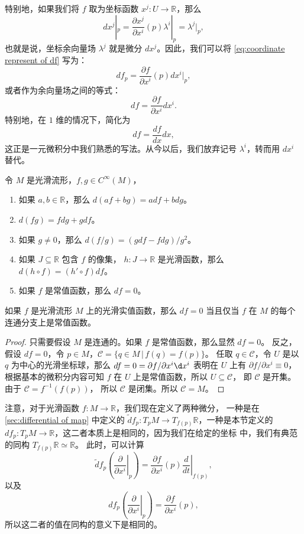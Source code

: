 特别地，如果我们将 $f$ 取为坐标函数 $x^j:U\to \mathbb{R}$，那么
\[
  dx^j|_p=  \frac{\partial x^j}{\partial x^i}(p)\lambda^i|_p
  =\lambda^j|_p,
\]
也就是说，坐标余向量场 $\lambda^j$ 就是微分 $dx^j$。因此，我们可以将
\eqref{eq:coordinate represent of df} 写为：
\[
  df_p=  \frac{\partial f}{\partial x^i}(p)dx^i|_p,
\]
或者作为余向量场之间的等式：
\begin{equation}
  df=\frac{\partial f}{\partial x^i}dx^i.
\end{equation}
特别地，在 $1$ 维的情况下，简化为
\[
  df=\frac{df}{dx}dx,  
\]
这正是一元微积分中我们熟悉的写法。从今以后，我们放弃记号
$\lambda^i$，转而用 $dx^i$ 替代。

\begin{proposition}[微分的性质]
  令 $M$ 是光滑流形，$f,g\in C^\infty(M)$，
  \begin{enumerate}
    \item 如果 $a,b\in \mathbb{R}$，那么
    $d(af+bg)=adf+bdg$。
    \item $d(fg)=fdg+gdf$。
    \item 如果 $g\neq 0$，那么 $d(f/g)=(gdf-fdg)/g^2$。
    \item 如果 $J\subseteq \mathbb{R}$ 包含 $f$ 的像集，
    $h:J\to \mathbb{R}$ 是光滑函数，那么
    $d(h\circ f)=(h'\circ f)df$。
    \item 如果 $f$ 是常值函数，那么 $df=0$。
  \end{enumerate}
\end{proposition}

\begin{proposition}[微分为零的函数]\label{prop:functions with vanishing differential}
  如果 $f$ 是光滑流形 $M$ 上的光滑实值函数，那么 $df=0$
  当且仅当 $f$ 在 $M$ 的每个连通分支上是常值函数。
\end{proposition}
\begin{proof}
  只需要假设 $M$ 是连通的。如果 $f$ 是常值函数，那么显然 $df=0$。
  反之，假设 $df=0$，令 $p\in M$，$\mathcal{C}=\{q\in M\,|\, f(q)=f(p)\}$。
  任取 $q\in \mathcal{C}$，令 $U$ 是以 $q$ 为中心的光滑坐标球，那么
  $df=0=\partial f/\partial x^i \d x^i$ 表明在 $U$ 上有
  $\partial f/\partial x^i\equiv 0$，根据基本的微积分内容可知
  $f$ 在 $U$ 上是常值函数，所以 $U\subseteq \mathcal{C}$，
  即 $\mathcal{C}$ 是开集。由于 $\mathcal{C}=f^{-1}(f(p))$，
  所以 $\mathcal{C}$ 是闭集。所以 $\mathcal{C}=M$。
\end{proof}


注意，对于光滑函数 $f:M\to \mathbb{R}$，我们现在定义了两种微分，
一种是在 \ref{sec:differential of map} 中定义的
$\tilde{d}\!f_p:T_pM\to T_{f(p)}\mathbb{R}$，一种是本节定义的
$df_p:T_pM\to \mathbb{R}$，这二者本质上是相同的，因为我们在给定的坐标
中，我们有典范的同构 $T_{f(p)}\mathbb{R}\simeq \mathbb{R}$。
此时，可以计算
\[
  \tilde d\!f_p\left(\left.\frac{\partial}{\partial x^i}\right|_p\right)
  =\frac{\partial f}{\partial x^i}(p)\left.\frac{d}{dt}\right|_{f(p)},
\]
以及
\[
  df_p   \left(\left.\frac{\partial}{\partial x^i}\right|_p\right)
  =\frac{\partial f}{\partial x^i}(p),
\]
所以这二者的值在同构的意义下是相同的。


